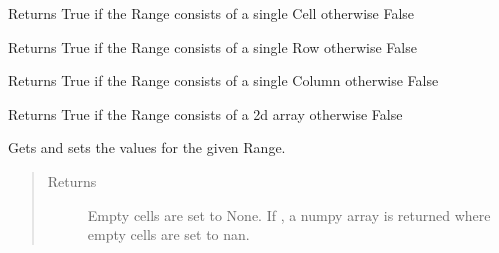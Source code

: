 \documentclass[letterpaper,11pt,english]{sphinxmanual}
\begin{document}
\begin{fulllineitems}
\begin{quote}
\begin{description}
\begin{itemize}
\end{itemize}

\end{description}\end{quote}

\begin{fulllineitems}
\label{range:xlwings.Range.is_cell}
Returns True if the Range consists of a single Cell otherwise False

\end{fulllineitems}


\begin{fulllineitems}
\label{range:xlwings.Range.is_row}
Returns True if the Range consists of a single Row otherwise False

\end{fulllineitems}


\begin{fulllineitems}
\label{range:xlwings.Range.is_column}
Returns True if the Range consists of a single Column otherwise False

\end{fulllineitems}


\begin{fulllineitems}
\label{range:xlwings.Range.is_table}
Returns True if the Range consists of a 2d array otherwise False

\end{fulllineitems}


\begin{fulllineitems}
\label{range:xlwings.Range.value}
Gets and sets the values for the given Range.
\begin{quote}\begin{description}
\item[{Returns}] \leavevmode
Empty cells are set to None. If ,
a numpy array is returned where empty cells are set to nan.


\end{description}
\end{quote}
\end{fulllineitems}
\end{fulllineitems}
\end{document}
